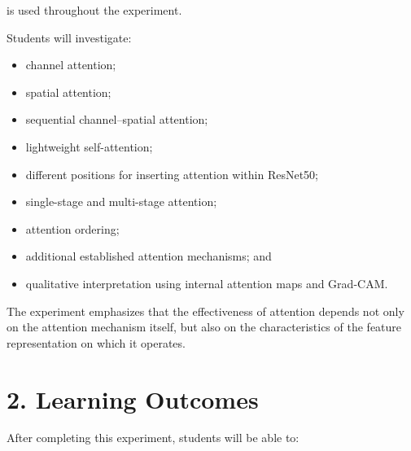 \documentclass[10pt]{article}
\begin{document}
is used throughout the experiment.

Students will investigate:

\begin{itemize}

\item channel attention;

\item spatial attention;

\item sequential channel--spatial attention;

\item lightweight self-attention;

\item different positions for inserting attention within ResNet50;

\item single-stage and multi-stage attention;

\item attention ordering;

\item additional established attention mechanisms; and

\item qualitative interpretation using internal attention maps and Grad-CAM.

\end{itemize}

The experiment emphasizes that the effectiveness of attention depends not
only on the attention mechanism itself, but also on the characteristics of
the feature representation on which it operates.

\section*{2. Learning Outcomes}

After completing this experiment, students will be able to:
\end{document}
